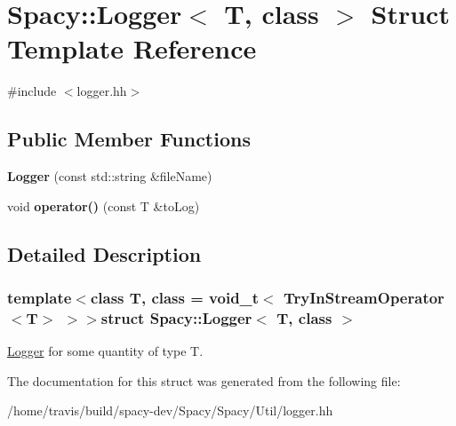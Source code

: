 \hypertarget{structSpacy_1_1Logger}{\section{\-Spacy\-:\-:\-Logger$<$ \-T, class $>$ \-Struct \-Template \-Reference}
\label{structSpacy_1_1Logger}
}


{\ttfamily \#include $<$logger.\-hh$>$}

\subsection*{\-Public \-Member \-Functions}
\begin{DoxyCompactItemize}
\item 
\hypertarget{structSpacy_1_1Logger_a689f95f10f159c8f4c3a841ffcdeaac8}{{\bfseries \-Logger} (const std\-::string \&file\-Name)}\label{structSpacy_1_1Logger_a689f95f10f159c8f4c3a841ffcdeaac8}

\item 
\hypertarget{structSpacy_1_1Logger_a4ee5bc204534bc4a3bd9b7e875c3a350}{void {\bfseries operator()} (const \-T \&to\-Log)}\label{structSpacy_1_1Logger_a4ee5bc204534bc4a3bd9b7e875c3a350}

\end{DoxyCompactItemize}


\subsection{\-Detailed \-Description}
\subsubsection*{template$<$class T, class = void\-\_\-t$<$ Try\-In\-Stream\-Operator$<$\-T$>$ $>$$>$struct Spacy\-::\-Logger$<$ T, class $>$}

\hyperlink{structSpacy_1_1Logger}{\-Logger} for some quantity of type \-T. 

\-The documentation for this struct was generated from the following file\-:\begin{DoxyCompactItemize}
\item 
/home/travis/build/spacy-\/dev/\-Spacy/\-Spacy/\-Util/logger.\-hh\end{DoxyCompactItemize}
